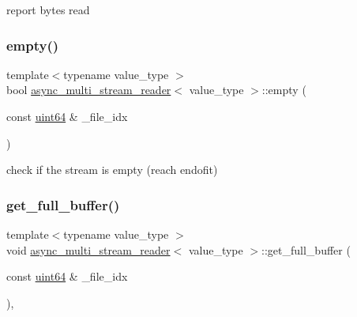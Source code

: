 report bytes read 

\mbox{\label{classasync__multi__stream__reader_aec2bb44c72b149387343e53cf6e65f7d}} 
\subsubsection{\texorpdfstring{empty()}{empty()}}
{\footnotesize\ttfamily template$<$typename value\+\_\+type $>$ \\
bool \hyperlink{classasync__multi__stream__reader}{async\+\_\+multi\+\_\+stream\+\_\+reader}$<$ value\+\_\+type $>$\+::empty (\begin{DoxyParamCaption}\item[{const \hyperlink{types_8h_a60e8696a4678cd348e991a1f172e53f7}{uint64} \&}]{\+\_\+file\+\_\+idx }\end{DoxyParamCaption})\hspace{0.3cm}{\ttfamily [inline]}}



check if the stream is empty (reach endofit) 

\mbox{\label{classasync__multi__stream__reader_afae17e2365e9ed10f30d398a550caa89}} 
\subsubsection{\texorpdfstring{get\+\_\+full\+\_\+buffer()}{get\_full\_buffer()}}
{\footnotesize\ttfamily template$<$typename value\+\_\+type $>$ \\
void \hyperlink{classasync__multi__stream__reader}{async\+\_\+multi\+\_\+stream\+\_\+reader}$<$ value\+\_\+type $>$\+::get\+\_\+full\+\_\+buffer (\begin{DoxyParamCaption}\item[{const \hyperlink{types_8h_a60e8696a4678cd348e991a1f172e53f7}{uint64} \&}]{\+\_\+file\+\_\+idx }\end{DoxyParamCaption})\hspace{0.3cm}{\ttfamily [inline]}, {\ttfamily [private]}}



